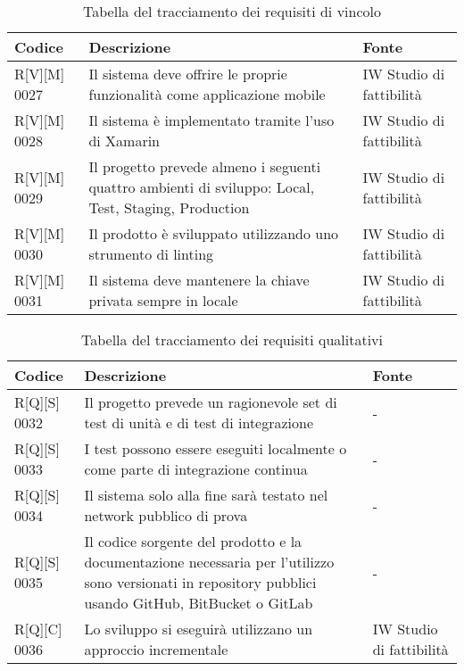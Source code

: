 \begin{table}%
\caption{Tabella del tracciamento dei requisiti di vincolo}
\label{tab:requisiti-vincolo}
\begin{tabularx}{\textwidth}{lXl}
\hline\hline
\textbf{Codice} & \textbf{Descrizione} & \textbf{Fonte}\\
\hline
R[V][M] 0027    & Il sistema deve offrire le proprie funzionalità come applicazione mobile &  IW Studio di fattibilità \\
\hline
R[V][M] 0028    & Il sistema è implementato tramite l’uso di Xamarin & IW Studio di fattibilità \\
\hline
R[V][M] 0029    & Il progetto prevede almeno i seguenti quattro ambienti di sviluppo: Local, Test, Staging, Production & IW Studio di fattibilità \\
\hline
R[V][M] 0030    & Il prodotto è sviluppato utilizzando uno strumento di linting & IW Studio di fattibilità \\
\hline
R[V][M] 0031    & Il sistema deve mantenere la chiave privata sempre in locale & IW Studio di fattibilità \\
\hline
\end{tabularx}
\end{table}%



\begin{table}%
    \caption{Tabella del tracciamento dei requisiti qualitativi}
    \label{tab:requisiti-qualitativi}
    \begin{tabularx}{\textwidth}{lXl}
    \hline\hline
    \textbf{Codice} & \textbf{Descrizione} & \textbf{Fonte}\\
    \hline
    R[Q][S] 0032    & Il progetto prevede un ragionevole set di test di unità e di test di integrazione & - \\
    \hline
    R[Q][S] 0033   & I test possono essere eseguiti localmente o come parte di integrazione continua & - \\
    \hline
    R[Q][S] 0034    & Il sistema solo alla fine sarà testato nel network pubblico di prova & - \\
    \hline
    R[Q][S] 0035    & Il codice sorgente del prodotto e la documentazione necessaria per l’utilizzo sono versionati in repository pubblici usando GitHub, BitBucket o GitLab & - \\
    \hline
    R[Q][C] 0036    & Lo sviluppo si eseguirà utilizzano un approccio incrementale  & IW Studio di fattibilità \\
    \hline
    \end{tabularx}
    \end{table}%


